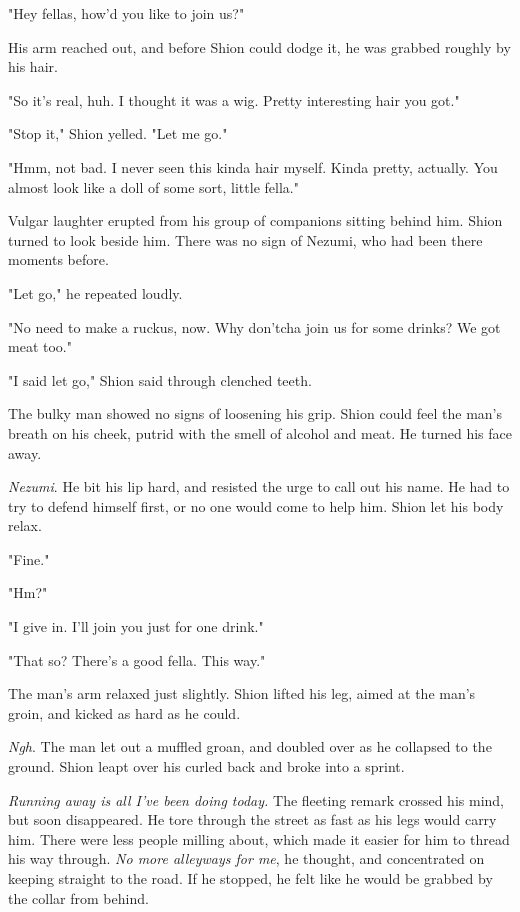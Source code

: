"Hey fellas, how'd you like to join us?"

His arm reached out, and before Shion could dodge it, he was grabbed
roughly by his hair.

"So it's real, huh. I thought it was a wig. Pretty interesting hair you
got."

"Stop it," Shion yelled. "Let me go."

"Hmm, not bad. I never seen this kinda hair myself. Kinda pretty,
actually. You almost look like a doll of some sort, little fella."

Vulgar laughter erupted from his group of companions sitting behind him.
Shion turned to look beside him. There was no sign of Nezumi, who had
been there moments before.

"Let go," he repeated loudly.

"No need to make a ruckus, now. Why don'tcha join us for some drinks? We
got meat too."

"I said let go," Shion said through clenched teeth.

The bulky man showed no signs of loosening his grip. Shion could feel
the man's breath on his cheek, putrid with the smell of alcohol and
meat. He turned his face away.

\emph{Nezumi}. He bit his lip hard, and resisted the urge to call out his name.
He had to try to defend himself first, or no one would come to help him.
Shion let his body relax.

"Fine."

"Hm?"

"I give in. I'll join you just for one drink."

"That so? There's a good fella. This way."

The man's arm relaxed just slightly. Shion lifted his leg, aimed at the
man's groin, and kicked as hard as he could.

\emph{Ngh}. The man let out a muffled groan, and doubled over as he collapsed
to the ground. Shion leapt over his curled back and broke into a sprint.

\emph{Running away is all I've been doing today.} The fleeting remark crossed
his mind, but soon disappeared. He tore through the street as fast as
his legs would carry him. There were less people milling about, which
made it easier for him to thread his way through. \emph{No more alleyways for
me}, he thought, and concentrated on keeping straight to the road. If he
stopped, he felt like he would be grabbed by the collar from behind.

